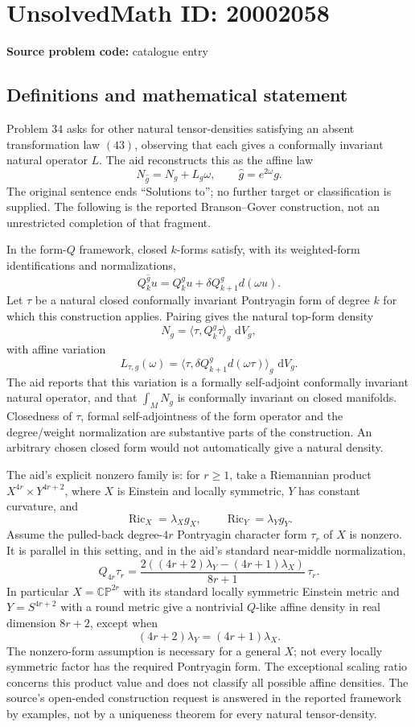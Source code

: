 \documentclass[11pt]{article}
\newcommand{\dd}{\,\mathrm{d}}
\begin{document}
\section*{UnsolvedMath ID: 20002058}
\textbf{Source problem code:} catalogue entry
\subsection{Definitions and mathematical statement}
Problem \(34\) asks for other natural tensor-densities satisfying an absent transformation law \((43)\), observing that each gives a conformally invariant natural operator \(L\). The aid reconstructs this as the affine law
\[
 N_{\widehat g}=N_g+L_g\omega,\qquad\widehat g=e^{2\omega}g.
\]
The original sentence ends ``Solutions to''; no further target or classification is supplied. The following is the reported Branson--Gover construction, not an unrestricted completion of that fragment.

In the form-\(Q\) framework, closed \(k\)-forms satisfy, with its weighted-form identifications and normalizations,
\[
 Q_k^{\widehat g}u=Q_k^gu+\delta Q_{k+1}^g d(\omega u).
\]
Let \(\tau\) be a natural closed conformally invariant Pontryagin form of degree \(k\) for which this construction applies. Pairing gives the natural top-form density
\[
 N_g=\langle\tau,Q_k^g\tau\rangle_g\,\dd V_g,
\]
with affine variation
\[
 L_{\tau,g}(\omega)=
 \langle\tau,\delta Q_{k+1}^g d(\omega\tau)\rangle_g\,\dd V_g.
\]
The aid reports that this variation is a formally self-adjoint conformally invariant natural operator, and that \(\int_MN_g\) is conformally invariant on closed manifolds. Closedness of \(\tau\), formal self-adjointness of the form operator and the degree/weight normalization are substantive parts of the construction. An arbitrary chosen closed form would not automatically give a natural density.

The aid's explicit nonzero family is: for \(r\geq1\), take a Riemannian product \(X^{4r}\times Y^{4r+2}\), where \(X\) is Einstein and locally symmetric, \(Y\) has constant curvature, and
\[
 \operatorname{Ric}_X=\lambda_X g_X,\qquad
 \operatorname{Ric}_Y=\lambda_Y g_Y.
\]
Assume the pulled-back degree-\(4r\) Pontryagin character form \(\tau_r\) of \(X\) is nonzero. It is parallel in this setting, and in the aid's standard near-middle normalization,
\[
 Q_{4r}\tau_r=
 \frac{2((4r+2)\lambda_Y-(4r+1)\lambda_X)}{8r+1}\,\tau_r.
\]
In particular \(X=\mathbb{CP}^{2r}\) with its standard locally symmetric Einstein metric and \(Y=S^{4r+2}\) with a round metric give a nontrivial \(Q\)-like affine density in real dimension \(8r+2\), except when
\[
 (4r+2)\lambda_Y=(4r+1)\lambda_X.
\]
The nonzero-form assumption is necessary for a general \(X\); not every locally symmetric factor has the required Pontryagin form. The exceptional scaling ratio concerns this product value and does not classify all possible affine densities. The source's open-ended construction request is answered in the reported framework by examples, not by a uniqueness theorem for every natural tensor-density.
\end{document}
